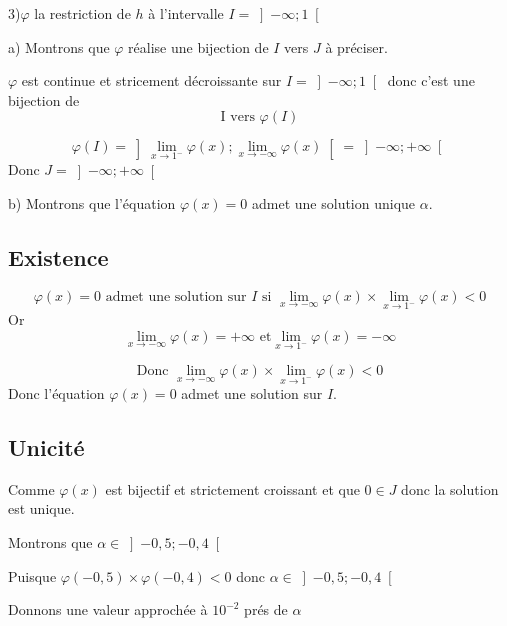 \documentclass[12pt]{article}
\begin{document}
3)$\varphi$ la restriction de $h$ à l’intervalle $I=\left]-\infty; 1 \right[ $
   
    a) Montrons que $\varphi$  réalise une bijection de $I$ vers $J$  à préciser.
    
$\varphi$ est continue et stricement décroissante sur $I=\left]-\infty; 1 \right[  $ donc c'est une bijection de \[\text{I vers } \varphi(I)\]

\[\varphi(I)=\left] \lim_{x \to 1^{-}}\varphi(x); \lim_{x \to -\infty}\varphi(x) \right[=\left]-\infty; +\infty\right[\]
    Donc $J=\left]-\infty; +\infty\right[$
    
b) Montrons que l’équation $\varphi(x)=0$ admet une solution unique $\alpha$. 

\subsection*{Existence}
\[\varphi(x)=0 \text{ admet une solution sur $I$ si } \lim_{x \to -\infty}\varphi(x)\times\lim_{x \to 1^{-}}\varphi(x)<0\]
Or
\[\lim_{x \to -\infty}\varphi(x)=+\infty \text{ et} \lim_{x \to 1^{-}}\varphi(x)=-\infty\]

\[\text{Donc } \lim_{x \to -\infty}\varphi(x)\times\lim_{x \to 1^{-}}\varphi(x)<0\]
Donc l'équation $\varphi(x)=0$ admet une solution sur $I$.
\subsection*{Unicité}
Comme $\varphi(x)$ est bijectif et strictement croissant et que $0\in J$ donc la solution est unique. 

Montrons que $\alpha \in \left]-0,5 ; -0,4 \right[ $

Puisque $\varphi(-0,5)\times \varphi(-0,4)<0$ donc $\alpha \in \left]-0,5 ; -0,4 \right[ $

Donnons une valeur approchée à $10^{-2}$ prés de $\alpha$
\end{document}
